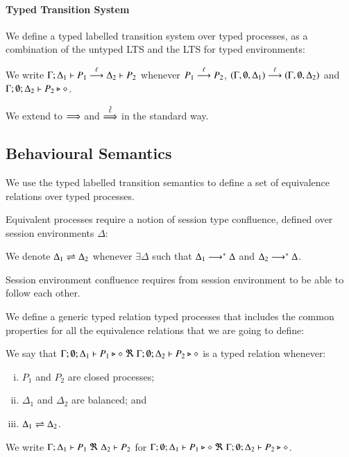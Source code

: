 \paragraph{Typed Transition System}

We define a typed labelled transition system over typed processes,
as a combination of the untyped LTS and the LTS for typed environments:

\begin{definition}\label{d:tlts}\rm
	\label{def:typed_transition}
	We write
	$\Gamma; \Delta_1 \vdash P_1 \stackrel{\ell}{\longrightarrow} \Delta_2 \vdash P_2$
	whenever
	$P_1 \stackrel{\ell}{\longrightarrow} P_2$,
	$(\Gamma, \emptyset, \Delta_1) \stackrel{\ell}{\longrightarrow} (\Gamma, \emptyset, \Delta_2)$
	and $\Gamma; \emptyset; \Delta_2 \vdash P_2 \triangleright \diamond$.

	\noi We extend to $\stackrel{}{\Longrightarrow}$ and $\stackrel{\hat{\ell}}{\Longrightarrow}$ in the standard way.
\end{definition}

\subsection{Behavioural Semantics}

We use the typed labelled transition semantics to define
a set of equivalence relations over typed processes.

Equivalent processes require a notion of session type confluence,
defined over session environments $\Delta$:
%
\begin{definition}\rm
	We denote $\Delta_1 \rightleftharpoons \Delta_2$ whenever $\exists \Delta$ such that
	$\Delta_1 \longrightarrow^* \Delta$ and $\Delta_2 \longrightarrow^* \Delta$.
\end{definition}
%
Session environment confluence requires from session environment
to be able to follow each other.

We define a generic typed relation typed processes that
includes the common properties for all the equivalence relations
that we are going to define:
%
\begin{definition}\rm
	We say that
	$\Gamma; \emptyset; \Delta_1 \vdash P_1 \triangleright \diamond\ \Re \ \Gamma; \emptyset; \Delta_2 \vdash P_2 \triangleright \diamond$
	is a typed relation whenever:
	\begin{enumerate}[i)]
		\item	$P_1$ and $P_2$ are closed processes;
		\item	$\Delta_1$ and $\Delta_2$ are balanced; and
		\item	$\Delta_1 \rightleftharpoons \Delta_2$.
	\end{enumerate}
%
	\noi We write
	$\horel{\Gamma}{\Delta_1}{P_1}{\ \Re\ }{\Delta_2}{P_2}$
	for $\Gamma; \emptyset; \Delta_1 \vdash P_1 \triangleright \diamond\ \Re\ \Gamma; \emptyset; \Delta_2 \vdash P_2 \triangleright \diamond$.
\end{definition}

